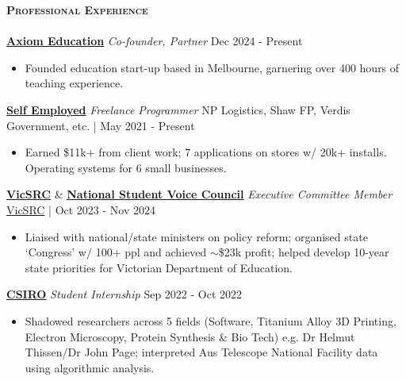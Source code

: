 \documentclass[a4paper]{article}
\newcommand{\lineunder} {
    \vspace*{-8pt} \\
    \hspace*{-10pt} \hrulefill \\
}
\newcommand{\header} [1] {
    {\hspace*{-10pt}\vspace*{6pt} \large\textsc{\textbf{#1}}}
    \vspace*{-6pt} \lineunder
}
\begin{document}
\vspace*{1mm}
\header{Professional Experience}

\textbf{\href{https://axiomeducation.org/}{\ul{Axiom Education}}} \textit{Co-founder, Partner} \hfill Dec 2024 - Present\\
\vspace{-3.5mm}
\begin{itemize} \itemsep 0.5pt
\item Founded education start-up based in Melbourne, garnering over 400 hours of teaching experience.
\end{itemize}
\vspace{-2.5mm}

\textbf{\href{https://garv-shah.github.io/portfolio/}{\ul{Self Employed}}} \textit{Freelance Programmer} \hfill NP Logistics, Shaw FP, Verdis Government, etc. | May 2021 - Present\\
\vspace{-3.5mm}
\begin{itemize} \itemsep 0.5pt
\item Earned \$11k+ from client work; 7 applications on stores w/ 20k+ installs. Operating systems for 6 small businesses.
\end{itemize}
\vspace{-2.5mm}

\textbf{\href{https://vicsrc.org.au/about/executive-committee}{\ul{VicSRC}}} \& \textbf{\href{https://garv-shah.github.io/nsvc.pdf}{\ul{National Student Voice Council}}} \textit{Executive Committee Member} \hfill \href{https://vicsrc.org.au/}{VicSRC} | Oct 2023 - Nov 2024\\
\vspace{-3.5mm}
\begin{itemize} \itemsep 0.5pt
\item Liaised with national/state ministers on policy reform; organised state ‘Congress’ w/ 100+ ppl and achieved $\sim$\$23k profit; helped develop 10-year state priorities for Victorian Department of Education.
\end{itemize}
\vspace{-2.5mm}

\textbf{\href{https://www.csiro.au/en/}{\ul{CSIRO}}} \textit{Student Internship} \hfill Sep 2022 - Oct 2022\\
\vspace{-3.5mm}
\begin{itemize} \itemsep 0.5pt
\item Shadowed researchers across 5 fields (Software, Titanium Alloy 3D Printing, Electron Microscopy, Protein Synthesis \& Bio Tech) e.g. Dr Helmut Thissen/Dr John Page; interpreted Aus Telescope National Facility data using algorithmic analysis.
\end{itemize}
\vspace{-2.5mm}
\end{document}
